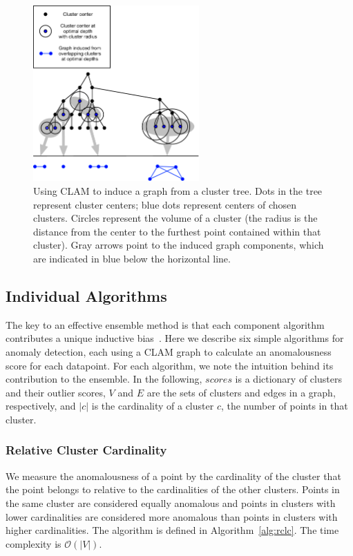 \begin{figure}[ht!]
    \centering
    \includegraphics[width=2.5in]{images/tree-graph.pdf}
    \caption{Using CLAM to induce a graph from a cluster tree.
        Dots in the tree represent cluster centers;
        blue dots represent centers of chosen clusters.
        Circles represent the volume of a cluster (the radius is the distance from the center to the furthest point contained within that cluster).
        Gray arrows point to the induced graph components, which are indicated in blue below the horizontal line.}
    \label{fig:methods:graph-generation}
\end{figure}


\subsection{Individual Algorithms}
\label{subsec:methods:individual-algorithms}

The key to an effective ensemble method is that each component algorithm contributes a unique inductive bias~\cite{chen2017outlier}.
Here we describe six simple algorithms for anomaly detection, each using a CLAM graph to calculate an anomalousness score for each datapoint.
For each algorithm, we note the intuition behind its contribution to the ensemble.
In the following, $scores$ is a dictionary of clusters and their outlier scores,
$V$ and $E$ are the sets of clusters and edges in a graph, respectively, and $|c|$ is
the cardinality of a cluster $c$, the number of points in that cluster.


\subsubsection{Relative Cluster Cardinality}
We measure the anomalousness of a point by the cardinality of the cluster that the point belongs to relative to the cardinalities of the other clusters.
Points in the same cluster are considered equally anomalous and points in clusters with lower cardinalities are considered more anomalous than points in clusters with higher cardinalities.
The algorithm is defined in Algorithm~\ref{alg:rclc}.
The time complexity is $\mathcal{O}(|V|)$.

